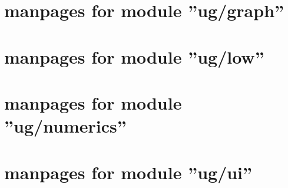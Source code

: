 \thispagestyle{plain}
\section{manpages for module ''ug/graph''}
\renewcommand{\sectitle}{ug/graph}


\thispagestyle{plain}
\section{manpages for module ''ug/low''}
\renewcommand{\sectitle}{ug/low}


\thispagestyle{plain}
\section{manpages for module ''ug/numerics''}
\renewcommand{\sectitle}{ug/numerics}


\thispagestyle{plain}
\section{manpages for module ''ug/ui''}
\renewcommand{\sectitle}{ug/ui}






